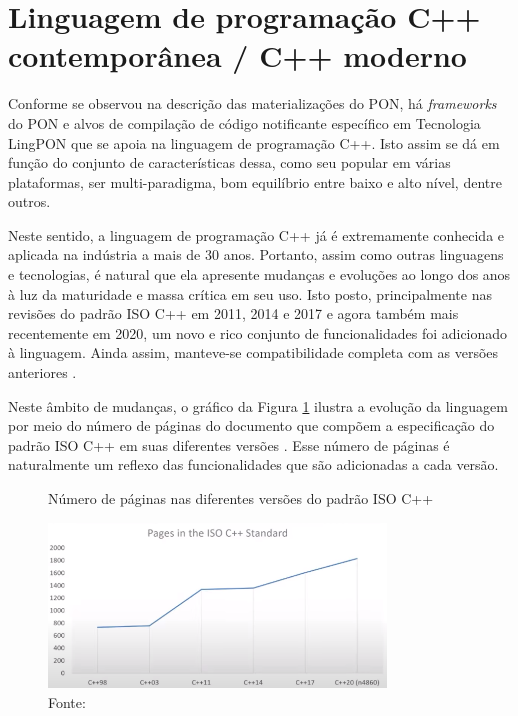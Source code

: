 \section{Linguagem de programação C++ contemporânea / C++ moderno}\label{sec:cpp_moderno}

Conforme se observou na descrição das materializações do PON, há
\textit{frameworks} do PON e alvos de compilação de código notificante
específico em Tecnologia LingPON que se apoia na linguagem de programação C++.
Isto assim se dá em função do conjunto de características dessa, como seu
popular em várias plataformas, ser multi-paradigma, bom equilíbrio entre baixo e
alto nível, dentre outros.

Neste sentido, a linguagem de programação C++ já é extremamente conhecida e
aplicada na indústria a mais de 30 anos. Portanto, assim como outras linguagens
e tecnologias, é natural que ela apresente mudanças e evoluções ao longo dos
anos à luz da maturidade e massa crítica em seu uso. Isto posto, principalmente
nas revisões do padrão ISO C++ em 2011, 2014 e 2017 e agora também mais
recentemente em 2020, um novo e rico conjunto de funcionalidades foi adicionado
à linguagem. Ainda assim, manteve-se compatibilidade completa com as versões
anteriores \cite{bjarne_2020}.

Neste âmbito de mudanças, o gráfico da Figura \ref{fig:iso_cpp} ilustra a
evolução da linguagem por meio do número de páginas do documento que compõem a
especificação do padrão ISO C++ em suas diferentes versões
\cite{iso_cpp17,feldman_2019}. Esse número de páginas é naturalmente um reflexo
das funcionalidades que são adicionadas a cada versão.

\begin{figure}[!htb]
  \centering
  \caption{Número de páginas nas diferentes versões do padrão ISO C++}
  \includegraphics[width=0.8\textwidth]{../figures/iso_cpp.png}
  \smallskip
  \caption*{Fonte: }
  \label{fig:iso_cpp}
\end{figure}

